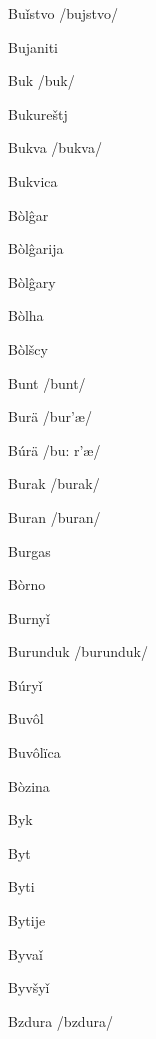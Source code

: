 Buǐstvo /bujstvo/

Bujaniti 

Buk /buk/

Bukureštj 

Bukva /bukva/

Bukvica 

Bòlĝar 

Bòlĝarija 

Bòlĝary 

Bòlha 

Bòlšcy 

Bunt /bunt/

Burä /bur’æ/

Búrä /bu: r’æ/

Burak /burak/

Buran /buran/

Burgas 

Bòrno 

Burnyǐ 

Burunduk /burunduk/

Búryǐ 

Buvôl 

Buvôlïca 

Bòzina 

Byk 

Byt 

Byti 

Bytije 

Byvaǐ 

Byvšyǐ 

Bzdura /bzdura/